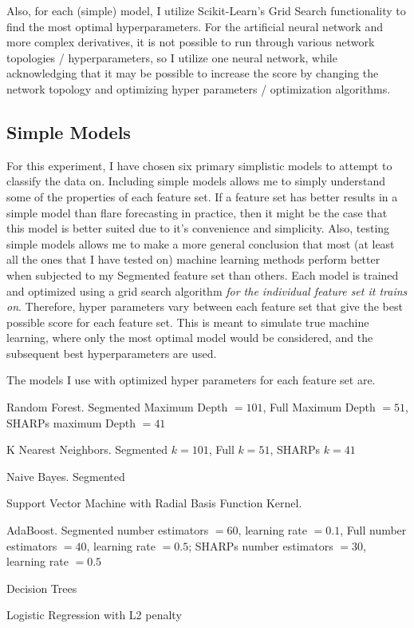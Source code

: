 Also, for each (simple) model, I utilize Scikit-Learn's Grid Search functionality to find the most optimal hyperparameters. For the artificial neural network and more complex derivatives, it is not possible to run through various network topologies / hyperparameters, so I utilize one neural network, while acknowledging that it may be possible to increase the score by changing the network topology and optimizing hyper parameters / optimization algorithms.

\subsection{Simple Models}

For this experiment, I have chosen six primary simplistic models to attempt to classify the data on. Including simple models allows me to simply understand some of the properties of each feature set. If a feature set has better results in a simple model than flare forecasting in practice, then it might be the case that this model is better suited due to it's convenience and simplicity. Also, testing simple models allows me to make a more general conclusion that most (at least all the ones that I have tested on) machine learning methods perform better when subjected to my Segmented feature set than others. Each model is trained and optimized using a grid search algorithm \textit{for the individual feature set it trains on}. Therefore, hyper parameters vary between each feature set that give the best possible score for each feature set. This is meant to simulate true machine learning, where only the most optimal model would be considered, and the subsequent best hyperparameters are used.   


The models I use with optimized hyper parameters for each feature set are.

Random Forest. Segmented Maximum Depth $= 101$, Full Maximum Depth $= 51$, SHARPs maximum Depth $= 41$

K Nearest Neighbors. Segmented $k = 101$, Full $k = 51$, SHARPs $k = 41$ 

Naive Bayes. Segmented 

Support Vector Machine with Radial Basis Function Kernel. 

AdaBoost. Segmented number estimators $= 60$, learning rate $= 0.1$, Full number estimators $= 40$, learning rate $= 0.5$; SHARPs number estimators $= 30$, learning rate $= 0.5$

Decision Trees

Logistic Regression with L2 penalty

